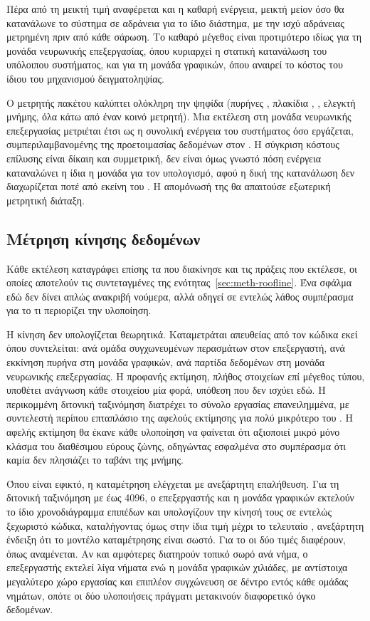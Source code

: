 Πέρα από τη μεικτή τιμή αναφέρεται και η καθαρή ενέργεια, μεικτή μείον όσο θα
κατανάλωνε το σύστημα σε αδράνεια για το ίδιο διάστημα, με την ισχύ αδράνειας
μετρημένη πριν από κάθε σάρωση. Το καθαρό μέγεθος είναι προτιμότερο ιδίως για
τη μονάδα νευρωνικής επεξεργασίας, όπου κυριαρχεί η στατική κατανάλωση του
υπόλοιπου συστήματος, και για τη μονάδα γραφικών, όπου αναιρεί το κόστος του
ίδιου του μηχανισμού δειγματοληψίας.

Ο μετρητής πακέτου καλύπτει ολόκληρη την ψηφίδα (πυρήνες , πλακίδια
, , ελεγκτή μνήμης, όλα κάτω από έναν κοινό μετρητή). Μια
εκτέλεση στη μονάδα νευρωνικής επεξεργασίας μετριέται έτσι ως η συνολική
ενέργεια του συστήματος όσο εργάζεται, συμπεριλαμβανομένης της προετοιμασίας
δεδομένων στον . Η σύγκριση κόστους επίλυσης είναι δίκαιη και
συμμετρική, δεν είναι όμως γνωστό πόση ενέργεια καταναλώνει η ίδια η μονάδα για
τον υπολογισμό, αφού η δική της κατανάλωση δεν διαχωρίζεται ποτέ από εκείνη του
. Η απομόνωσή της θα απαιτούσε εξωτερική μετρητική διάταξη.

\subsection{Μέτρηση κίνησης δεδομένων}
\label{sec:meth-traffic}

Κάθε εκτέλεση καταγράφει επίσης τα  που διακίνησε και τις πράξεις που
εκτέλεσε, οι οποίες αποτελούν τις συντεταγμένες της
ενότητας~\ref{sec:meth-roofline}. Ένα σφάλμα εδώ δεν δίνει απλώς ανακριβή
νούμερα, αλλά οδηγεί σε εντελώς λάθος συμπέρασμα για το τι περιορίζει την
υλοποίηση.

Η κίνηση δεν υπολογίζεται θεωρητικά. Καταμετράται απευθείας από τον κώδικα εκεί
όπου συντελείται: ανά ομάδα συγχωνευμένων περασμάτων στον επεξεργαστή, ανά
εκκίνηση πυρήνα στη μονάδα γραφικών, ανά παρτίδα δεδομένων στη μονάδα
νευρωνικής επεξεργασίας. Η προφανής εκτίμηση, πλήθος στοιχείων επί μέγεθος
τύπου, υποθέτει ανάγνωση κάθε στοιχείου μία φορά, υπόθεση που δεν ισχύει εδώ. Η
περικομμένη διτονική ταξινόμηση διατρέχει το σύνολο εργασίας επανειλημμένα, με
συντελεστή περίπου επταπλάσιο της αφελούς εκτίμησης για  πολύ μικρότερο
του . Η αφελής εκτίμηση θα έκανε κάθε υλοποίηση να φαίνεται ότι αξιοποιεί
μικρό μόνο κλάσμα του διαθέσιμου εύρους ζώνης, οδηγώντας εσφαλμένα στο
συμπέρασμα ότι καμία δεν πλησιάζει το ταβάνι της μνήμης.

Όπου είναι εφικτό, η καταμέτρηση ελέγχεται με ανεξάρτητη επαλήθευση. Για τη
διτονική ταξινόμηση με  έως 4096, ο επεξεργαστής και η μονάδα γραφικών
εκτελούν το ίδιο χρονοδιάγραμμα επιπέδων και υπολογίζουν την κίνησή τους σε
εντελώς ξεχωριστό κώδικα, καταλήγοντας όμως στην ίδια τιμή μέχρι το τελευταίο
, ανεξάρτητη ένδειξη ότι το μοντέλο καταμέτρησης είναι σωστό. Για το
 οι δύο τιμές διαφέρουν, όπως αναμένεται. Αν και αμφότερες
διατηρούν τοπικό σωρό ανά νήμα, ο επεξεργαστής εκτελεί λίγα νήματα ενώ η μονάδα
γραφικών χιλιάδες, με αντίστοιχα μεγαλύτερο χώρο εργασίας και επιπλέον
συγχώνευση σε δέντρο εντός κάθε ομάδας νημάτων, οπότε οι δύο υλοποιήσεις
πράγματι μετακινούν διαφορετικό όγκο δεδομένων.


